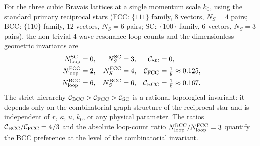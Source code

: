 \begin{theorem}
\label{thm:combinatorial}
For the three cubic Bravais lattices at a single momentum scale $k_0$,
using the standard primary reciprocal stars (FCC: $\{111\}$ family,
$8$ vectors, $N_S = 4$ pairs; BCC: $\{110\}$ family, $12$ vectors,
$N_S = 6$ pairs; SC: $\{100\}$ family, $6$ vectors, $N_S = 3$ pairs),
the non-trivial 4-wave resonance-loop counts and the dimensionless
geometric invariants are
\begin{align}
N_{\rm loop}^{\rm SC}  &= 0, & N_S^{\rm SC}  &= 3, &
\mathcal{C}_{\rm SC}  &= 0, \\
N_{\rm loop}^{\rm FCC} &= 2, & N_S^{\rm FCC} &= 4, &
\mathcal{C}_{\rm FCC} &= \tfrac{1}{8} \approx 0.125, \\
N_{\rm loop}^{\rm BCC} &= 6, & N_S^{\rm BCC} &= 6, &
\mathcal{C}_{\rm BCC} &= \tfrac{1}{6} \approx 0.167.
\end{align}
The strict hierarchy
$\mathcal{C}_{\rm BCC} > \mathcal{C}_{\rm FCC} > \mathcal{C}_{\rm SC}$
is a rational topological invariant: it depends only on the
combinatorial graph structure of the reciprocal star and is
independent of $r$, $\kappa$, $u$, $k_0$, or any physical parameter.
The ratios
$\mathcal{C}_{\rm BCC}/\mathcal{C}_{\rm FCC} = 4/3$ and the absolute
loop-count ratio $N_{\rm loop}^{\rm BCC}/N_{\rm loop}^{\rm FCC} = 3$
quantify the BCC preference at the level of the combinatorial
invariant.
\end{theorem}

